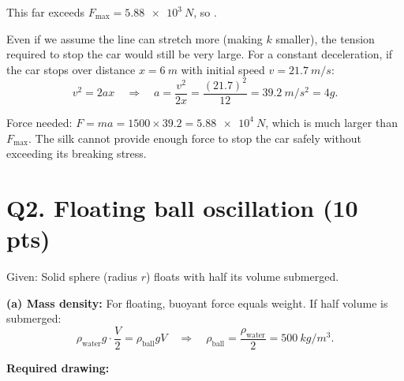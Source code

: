 \documentclass[11pt]{article}
\newcommand{\ans}[1]{\boxed{\displaystyle #1}}
\begin{document}
This far exceeds $F_{\text{max}} = \SI{5.88e3}{N}$, so \ans{the line would break}. 

Even if we assume the line can stretch more (making $k$ smaller), the tension required to stop the car would still be very large. For a constant deceleration, if the car stops over distance $x = \SI{6}{m}$ with initial speed $v = \SI{21.7}{m/s}$:
\[ v^2 = 2ax \quad\Rightarrow\quad a = \frac{v^2}{2x} = \frac{(21.7)^2}{12} = \SI{39.2}{m/s^2} = 4g. \]

Force needed: $F = ma = 1500 \times 39.2 = \SI{5.88e4}{N}$, which is much larger than $F_{\text{max}}$. The silk cannot provide enough force to stop the car safely without exceeding its breaking stress.

\section*{Q2. Floating ball oscillation (10 pts)}
Given: Solid sphere (radius $r$) floats with half its volume submerged.

\textbf{(a) Mass density:} For floating, buoyant force equals weight. If half volume is submerged:
\[ \rho_{\text{water}} g \cdot \frac{V}{2} = \rho_{\text{ball}} g V \quad\Rightarrow\quad \rho_{\text{ball}} = \frac{\rho_{\text{water}}}{2} = \ans{\SI{500}{kg/m^3}}. \]

\textbf{Required drawing:}
\begin{center}
\end{center}
\end{document}
